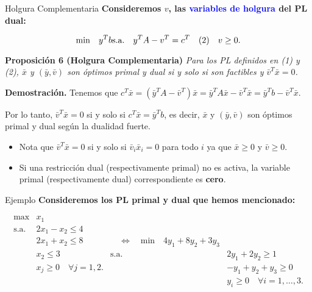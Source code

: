 \documentclass{beamer}
\begin{document}
\begin{frame}{Holgura Complementaria}
    \textbf{Consideremos \( v \), las \textcolor{blue}{variables de holgura} del PL dual:}

    \[
    \text{min} \quad y^T b \\
    \text{s.a.} \quad y^T A - v^T = c^T \quad (2) \\
    \quad v \geq 0.
    \]

    \vspace{0.5cm}
    \begin{block}{\textbf{Proposición 6 (Holgura Complementaria)}}
        \textit{Para los PL definidos en (1) y (2), \(\bar{x}\) y \((\bar{y}, \bar{v})\) son óptimos primal y dual si y solo si son factibles y \(\bar{v}^T \bar{x} = 0\).}
    \end{block}

    \vspace{0.5cm}
    \textbf{Demostración.} Tenemos que \( c^T \bar{x} = \left( \bar{y}^T A - \bar{v}^T \right) \bar{x} = \bar{y}^T A \bar{x} - \bar{v}^T \bar{x} = \bar{y}^T b - \bar{v}^T \bar{x} \).

    \vspace{0.3cm}
    Por lo tanto, \(\bar{v}^T \bar{x} = 0\) si y solo si \( c^T \bar{x} = \bar{y}^T b\), es decir, \(\bar{x}\) y \((\bar{y}, \bar{v})\) son óptimos primal y dual según la dualidad fuerte.

    \begin{itemize}
        \item Nota que \(\bar{v}^T \bar{x} = 0\) si y solo si \(\bar{v}_i \bar{x}_i = 0\) para todo \( i \) ya que \(\bar{x} \geq 0\) y \(\bar{v} \geq 0\).
        \item Si una restricción dual (respectivamente primal) no es activa, la variable primal (respectivamente dual) correspondiente es \textbf{cero}.
    \end{itemize}
\end{frame}

\begin{frame}{Ejemplo}
    \textbf{Consideremos los PL primal y dual que hemos mencionado:}

    \[
    \begin{array}{lll}
    \text{max} & x_1 & \\
    \text{s.a.} & 2x_1 - x_2 \leq 4 & \\
    & 2x_1 + x_2 \leq 8 & \quad \Leftrightarrow \quad \text{min} \quad 4y_1 + 8y_2 + 3y_3 \\
    & x_2 \leq 3 & \text{s.a.} & 2y_1 + 2y_2 \geq 1 \\
    & x_j \geq 0 \quad \forall j = 1, 2. & & -y_1 + y_2 + y_3 \geq 0 \\
    & & & y_i \geq 0 \quad \forall i = 1, \ldots, 3.
    \end{array}
    \]
\end{frame}
\end{document}
